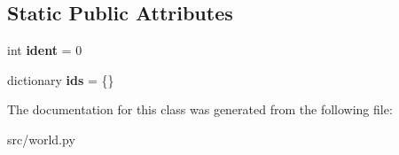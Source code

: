 \subsection*{\-Static \-Public \-Attributes}
\begin{DoxyCompactItemize}
\item 
\hypertarget{classsrc_1_1world_1_1_base_object_a25746ae66700933c41eb87f48de16f18}{int {\bfseries ident} = 0}\label{classsrc_1_1world_1_1_base_object_a25746ae66700933c41eb87f48de16f18}

\item 
\hypertarget{classsrc_1_1world_1_1_base_object_a31db5e55de81013c8af360bc8f59f5dd}{dictionary {\bfseries ids} = \{\}}\label{classsrc_1_1world_1_1_base_object_a31db5e55de81013c8af360bc8f59f5dd}

\end{DoxyCompactItemize}


\-The documentation for this class was generated from the following file\-:\begin{DoxyCompactItemize}
\item 
src/world.\-py\end{DoxyCompactItemize}

